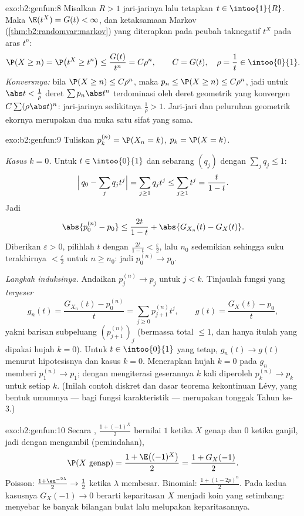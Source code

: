 \begin{solution}{exo:b2:genfun:8}
Misalkan $R > 1$ jari-jarinya lalu tetapkan $t \in \intoo{1}{R}$. Maka
$\E(t^X) = G(t) < \infty$, dan ketaksamaan Markov
(\cref{thm:b2:randomvar:markov}) yang diterapkan pada peubah taknegatif
$t^X$ pada aras $t^n$:
\[
\P(X \geq n) = \P\bigl(t^X \geq t^n\bigr)
\leq \frac{G(t)}{t^n} = C\rho^n,
\qquad C = G(t),\quad \rho = \frac1t \in \intoo{0}{1}.
\]
\emph{Konversnya:} bila $\P(X \geq n) \leq C\rho^n$, maka $p_n \leq
\P(X \geq n) \leq C\rho^n$, jadi untuk $\abs t < \frac1\rho$ deret
$\sum p_n\abs t^n$ terdominasi oleh deret geometrik yang konvergen
$C\sum(\rho\abs t)^n$: jari-jarinya sedikitnya
$\frac1\rho > 1$. Jari-jari  dan peluruhan geometrik
ekornya merupakan dua muka satu sifat yang sama.
\end{solution}

\begin{solution}{exo:b2:genfun:9}
Tuliskan $p_k^{(n)} = \P(X_n = k)$, $p_k = \P(X = k)$.

\emph{Kasus $k = 0$.} Untuk $t \in \intoo{0}{1}$ dan sebarang 
$(q_j)$ dengan $\sum_j q_j \leq 1$:
\[
\Bigl|\,q_0 - \sum_j q_jt^j\Bigr|
= \sum_{j \geq 1} q_j t^j
\leq \sum_{j\geq1}t^j = \frac{t}{1 - t} .
\]
Jadi
\[
\abs{p_0^{(n)} - p_0}
\leq \frac{2t}{1 - t}
+ \abs{G_{X_n}(t) - G_X(t)} .
\]
Diberikan $\varepsilon > 0$, pilihlah $t$ dengan $\frac{2t}{1-t} <
\frac\varepsilon2$, lalu $n_0$ sedemikian sehingga suku terakhirnya $<
\frac\varepsilon2$ untuk $n \geq n_0$: jadi $p_0^{(n)} \to p_0$.

\emph{Langkah induksinya.} Andaikan $p_j^{(n)} \to p_j$ untuk $j < k$.
Tinjaulah fungsi yang \emph{tergeser}
\[
g_n(t) = \frac{G_{X_n}(t) - p^{(n)}_0}{t}
= \sum_{j\geq0} p^{(n)}_{j+1}t^j,
\qquad
g(t) = \frac{G_X(t) - p_0}{t} ,
\]
yakni  barisan subpeluang
$(p^{(n)}_{j+1})_j$ (bermassa total $\leq 1$, dan hanya itulah yang dipakai
hujah $k = 0$). Untuk $t \in \intoo{0}{1}$ yang tetap, $g_n(t)
\to g(t)$ menurut hipotesisnya dan kasus $k = 0$. Menerapkan hujah $k =
0$ pada $g_n$ memberi $p_1^{(n)} \to p_1$; dengan mengiterasi
geserannya $k$ kali diperoleh $p_k^{(n)} \to p_k$ untuk setiap $k$. (Inilah
contoh diskret dan dasar teorema kekontinuan Lévy,
yang bentuk umumnya --- bagi fungsi karakteristik --- merupakan tonggak Tahun
ke-3.)
\end{solution}

\begin{solution}{exo:b2:genfun:10}
Secara , $\frac{1 + (-1)^X}{2}$ bernilai $1$ ketika $X$ genap
dan $0$ ketika ganjil, jadi dengan mengambil  (pemindahan),
\[
\P(X \text{ genap}) = \frac{1 + \E\bigl((-1)^X\bigr)}2 =
\frac{1 + G_X(-1)}2 .
\]
Poisson: $\frac{1 + \eu^{-2\lambda}}2 \to \frac12$ ketika
$\lambda$ membesar. Binomial: $\frac{1 + (1 - 2p)^n}2$. Pada kedua
kasusnya $G_X(-1) \to 0$ berarti keparitasan $X$ menjadi koin
yang setimbang:  menyebar ke banyak bilangan bulat lalu melupakan
keparitasannya.
\end{solution}

